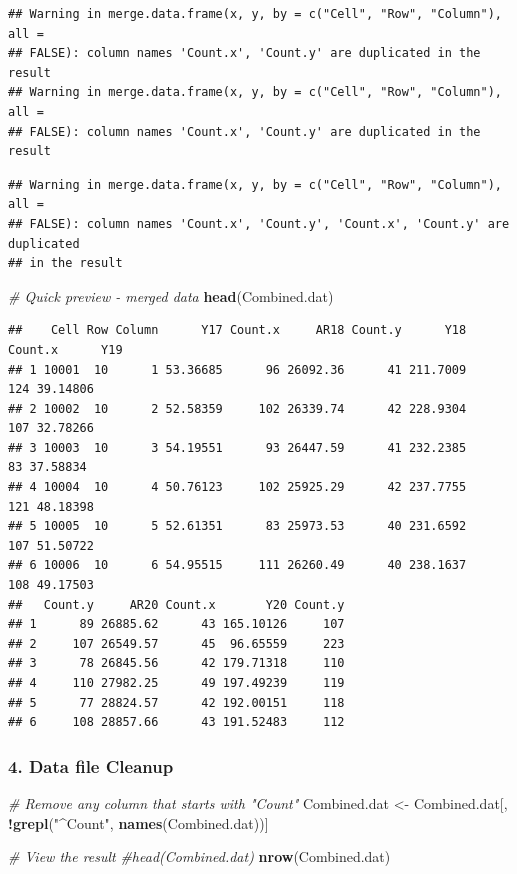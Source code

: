 \documentclass[
]{article}
\newenvironment{Shaded}{\begin{snugshade}}{\end{snugshade}}
\newcommand{\CommentTok}[1]{\textcolor[rgb]{0.56,0.35,0.01}{\textit{#1}}}
\newcommand{\FunctionTok}[1]{\textcolor[rgb]{0.13,0.29,0.53}{\textbf{#1}}}
\newcommand{\NormalTok}[1]{#1}
\newcommand{\OtherTok}[1]{\textcolor[rgb]{0.56,0.35,0.01}{#1}}
\newcommand{\SpecialCharTok}[1]{\textcolor[rgb]{0.81,0.36,0.00}{\textbf{#1}}}
\newcommand{\StringTok}[1]{\textcolor[rgb]{0.31,0.60,0.02}{#1}}
\begin{document}
\begin{verbatim}
## Warning in merge.data.frame(x, y, by = c("Cell", "Row", "Column"), all =
## FALSE): column names 'Count.x', 'Count.y' are duplicated in the result
## Warning in merge.data.frame(x, y, by = c("Cell", "Row", "Column"), all =
## FALSE): column names 'Count.x', 'Count.y' are duplicated in the result
\end{verbatim}

\begin{verbatim}
## Warning in merge.data.frame(x, y, by = c("Cell", "Row", "Column"), all =
## FALSE): column names 'Count.x', 'Count.y', 'Count.x', 'Count.y' are duplicated
## in the result
\end{verbatim}

\begin{Shaded}
\begin{Highlighting}[]
\CommentTok{\# Quick preview {-} merged data}
\FunctionTok{head}\NormalTok{(Combined.dat)}
\end{Highlighting}
\end{Shaded}

\begin{verbatim}
##    Cell Row Column      Y17 Count.x     AR18 Count.y      Y18 Count.x      Y19
## 1 10001  10      1 53.36685      96 26092.36      41 211.7009     124 39.14806
## 2 10002  10      2 52.58359     102 26339.74      42 228.9304     107 32.78266
## 3 10003  10      3 54.19551      93 26447.59      41 232.2385      83 37.58834
## 4 10004  10      4 50.76123     102 25925.29      42 237.7755     121 48.18398
## 5 10005  10      5 52.61351      83 25973.53      40 231.6592     107 51.50722
## 6 10006  10      6 54.95515     111 26260.49      40 238.1637     108 49.17503
##   Count.y     AR20 Count.x       Y20 Count.y
## 1      89 26885.62      43 165.10126     107
## 2     107 26549.57      45  96.65559     223
## 3      78 26845.56      42 179.71318     110
## 4     110 27982.25      49 197.49239     119
## 5      77 28824.57      42 192.00151     118
## 6     108 28857.66      43 191.52483     112
\end{verbatim}

\subsubsection{4. Data file Cleanup}\label{data-file-cleanup}

\begin{Shaded}
\begin{Highlighting}[]
\CommentTok{\# Remove any column that starts with "Count"}
\NormalTok{Combined.dat }\OtherTok{\textless{}{-}}\NormalTok{ Combined.dat[, }\SpecialCharTok{!}\FunctionTok{grepl}\NormalTok{(}\StringTok{"\^{}Count"}\NormalTok{, }\FunctionTok{names}\NormalTok{(Combined.dat))]}

\CommentTok{\# View the result}
\CommentTok{\#head(Combined.dat)}
\FunctionTok{nrow}\NormalTok{(Combined.dat)}
\end{Highlighting}
\end{Shaded}
\end{document}

